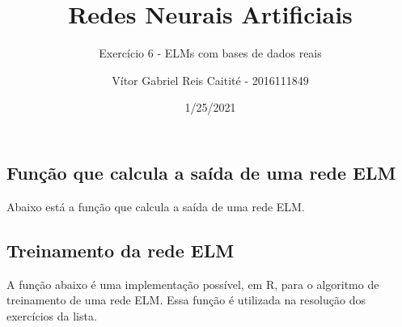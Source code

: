 \documentclass[
]{article}
\title{Redes Neurais Artificiais}
\subtitle{Exercício 6 - ELMs com bases de dados reais}
\author{Vítor Gabriel Reis Caitité - 2016111849}
\date{1/25/2021}
\newenvironment{Shaded}{\begin{snugshade}}{\end{snugshade}}
\newcommand{\CommentTok}[1]{\textcolor[rgb]{0.56,0.35,0.01}{\textit{#1}}}
\newcommand{\ControlFlowTok}[1]{\textcolor[rgb]{0.13,0.29,0.53}{\textbf{#1}}}
\newcommand{\DecValTok}[1]{\textcolor[rgb]{0.00,0.00,0.81}{#1}}
\newcommand{\KeywordTok}[1]{\textcolor[rgb]{0.13,0.29,0.53}{\textbf{#1}}}
\newcommand{\NormalTok}[1]{#1}
\newcommand{\OperatorTok}[1]{\textcolor[rgb]{0.81,0.36,0.00}{\textbf{#1}}}
\newcommand{\StringTok}[1]{\textcolor[rgb]{0.31,0.60,0.02}{#1}}
\begin{document}
\maketitle

\hypertarget{funuxe7uxe3o-que-calcula-a-sauxedda-de-uma-rede-elm}{%
\subsection{Função que calcula a saída de uma rede
ELM}\label{funuxe7uxe3o-que-calcula-a-sauxedda-de-uma-rede-elm}}

Abaixo está a função que calcula a saída de uma rede ELM.

\begin{Shaded}
\end{Shaded}

\hypertarget{treinamento-da-rede-elm}{%
\subsection{Treinamento da rede ELM}\label{treinamento-da-rede-elm}}

A função abaixo é uma implementação possível, em R, para o algoritmo de
treinamento de uma rede ELM. Essa função é utilizada na resolução dos
exercícios da lista.
\end{document}

